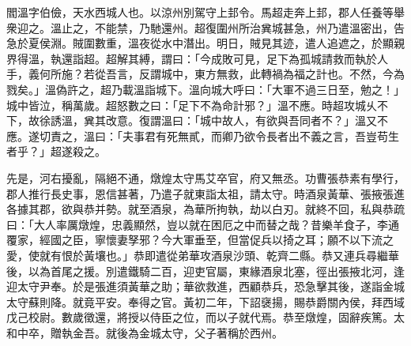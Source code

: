 
\begin{pinyinscope}
閻溫字伯儉，天水西城人也。以涼州別駕守上邽令。馬超走奔上邽，郡人任養等舉衆迎之。溫止之，不能禁，乃馳還州。超復圍州所治兾城甚急，州乃遣溫密出，告急於夏侯淵。賊圍數重，溫夜從水中潛出。明日，賊見其迹，遣人追遮之，於顯親界得溫，執還詣超。超解其縛，謂曰：「今成敗可見，足下為孤城請救而執於人手，義何所施？若從吾言，反謂城中，東方無救，此轉禍為福之計也。不然，今為戮矣。」溫偽許之，超乃載溫詣城下。溫向城大呼曰：「大軍不過三日至，勉之！」城中皆泣，稱萬歲。超怒數之曰：「足下不為命計邪？」溫不應。時超攻城乆不下，故徐誘溫，兾其改意。復謂溫曰：「城中故人，有欲與吾同者不？」溫又不應。遂切責之，溫曰：「夫事君有死無貳，而卿乃欲令長者出不義之言，吾豈苟生者乎？」超遂殺之。

先是，河右擾亂，隔絕不通，燉煌太守馬艾卒官，府又無丞。功曹張恭素有學行，郡人推行長史事，恩信甚著，乃遣子就東詣太祖，請太守。時酒泉黃華、張掖張進各據其郡，欲與恭并勢。就至酒泉，為華所拘執，劫以白刃。就終不回，私與恭疏曰：「大人率厲燉煌，忠義顯然，豈以就在困厄之中而替之哉？昔樂羊食子，李通覆家，經國之臣，寧懷妻孥邪？今大軍垂至，但當促兵以掎之耳；願不以下流之愛，使就有恨於黃壤也。」恭即遣從弟華攻酒泉沙頭、乾齊二縣。恭又連兵尋繼華後，以為首尾之援。別遣鐵騎二百，迎吏官屬，東緣酒泉北塞，徑出張掖北河，逢迎太守尹奉。於是張進須黃華之助；華欲救進，西顧恭兵，恐急擊其後，遂詣金城太守蘇則降。就竟平安。奉得之官。黃初二年，下詔襃揚，賜恭爵關內侯，拜西域戊己校尉。數歲徵還，將授以侍臣之位，而以子就代焉。恭至燉煌，固辭疾篤。太和中卒，贈執金吾。就後為金城太守，父子著稱於西州。


\end{pinyinscope}
